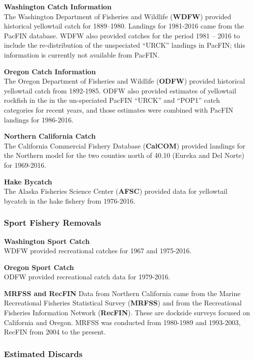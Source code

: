 \documentclass[12pt,]{article}
\begin{document}
\textbf{Washington Catch Information}\\
The Washington Department of Fisheries and Wildlife (\textbf{WDFW})
provided historical yellowtail catch for 1889--1980. Landings for
1981-2016 came from the PacFIN database. WDFW also provided catches for
the period 1981 -- 2016 to include the re-distribution of the
unspeciated ``URCK'' landings in PacFIN; this information is currently
not available from PacFIN.

\textbf{Oregon Catch Information}\\
The Oregon Department of Fisheries and Wildlife (\textbf{ODFW}) provided
historical yellowtail catch from 1892-1985. ODFW also provided estimates
of yellowtail rockfish in the in the un-speciated PacFIN ``URCK'' and
``POP1'' catch categories for recent years, and those estimates were
combined with PacFIN landings for 1986-2016.

\textbf{Northern California Catch}\\
The California Commercial Fishery Database (\textbf{CalCOM}) provided
landings for the Northern model for the two counties north of 40.10
(Eureka and Del Norte) for 1969-2016.

\textbf{Hake Bycatch}\\
The Alaska Fisheries Science Center (\textbf{AFSC}) provided data for
yellowtail bycatch in the hake fishery from 1976-2016.

\subsubsection{Sport Fishery Removals}\label{sport-fishery-removals}

\textbf{Washington Sport Catch}\\
WDFW provided recreational catches for 1967 and 1975-2016.

\textbf{Oregon Sport Catch}\\
ODFW provided recreational catch data for 1979-2016.

\textbf{MRFSS and RecFIN} Data from Northern California came from the
Marine Recreational Fisheries Statistical Survey (\textbf{MRFSS}) and
from the Recreational Fisheries Information Network (\textbf{RecFIN}).
These are dockside surveys focused on California and Oregon. MRFSS was
conducted from 1980-1989 and 1993-2003, RecFIN from 2004 to the present.

\subsubsection{Estimated Discards}\label{estimated-discards}
\end{document}
